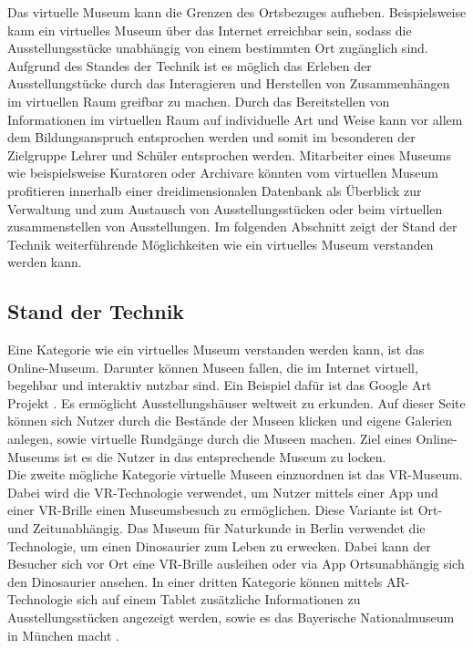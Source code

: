 \documentclass[runningheads,a4paper]{llncs}
\begin{document}
Das virtuelle Museum kann die Grenzen des Ortsbezuges aufheben. Beispielsweise kann ein virtuelles Museum über das Internet erreichbar sein, sodass die Ausstellungsstücke unabhängig von einem bestimmten Ort zugänglich sind. Aufgrund des Standes der Technik ist es möglich das Erleben der Ausstellungstücke durch das Interagieren und Herstellen von Zusammenhängen im virtuellen Raum greifbar zu machen. Durch das Bereitstellen von Informationen im virtuellen Raum auf individuelle Art und Weise kann vor allem dem Bildungsanspruch entsprochen werden und somit im besonderen der Zielgruppe Lehrer und Schüler entsprochen werden. Mitarbeiter eines Museums wie beispielsweise Kuratoren oder Archivare könnten vom virtuellen Museum profitieren innerhalb einer dreidimensionalen Datenbank als Überblick zur Verwaltung und zum Austausch von Ausstellungsstücken oder beim virtuellen zusammenstellen von Ausstellungen. Im folgenden Abschnitt zeigt der Stand der Technik weiterführende Möglichkeiten wie ein virtuelles Museum verstanden werden kann.\\

\subsection{Stand der Technik} \label{sect:standtechnik}

Eine Kategorie wie ein virtuelles Museum verstanden werden kann, ist das Online-Museum. Darunter können Museen fallen, die im Internet virtuell, begehbar und interaktiv nutzbar sind. Ein Beispiel dafür ist das Google Art Projekt \cite{GoogleCultureInstitut.2011}. Es ermöglicht Ausstellungshäuser weltweit zu erkunden. Auf dieser Seite können sich Nutzer durch die Bestände der Museen klicken und eigene Galerien anlegen, sowie virtuelle Rundgänge durch die Museen machen. Ziel eines Online-Museums ist es die Nutzer in das entsprechende Museum zu locken.\\ 

Die zweite mögliche Kategorie virtuelle Museen einzuordnen ist das VR-Museum. Dabei wird die VR-Technologie verwendet, um Nutzer mittels einer App und einer VR-Brille einen Museumsbesuch zu ermöglichen. Diese Variante ist Ort- und Zeitunabhängig. Das Museum für Naturkunde in Berlin verwendet die Technologie, um einen Dinosaurier zum Leben zu erwecken. Dabei kann der Besucher sich vor Ort eine VR-Brille ausleihen oder via App Ortsunabhängig sich den Dinosaurier ansehen. In einer dritten Kategorie können mittels AR-Technologie sich auf einem Tablet zusätzliche Informationen zu Ausstellungsstücken angezeigt werden, sowie es das Bayerische Nationalmuseum in München macht \cite{GoetheInstitute.V..2017}.\\
\end{document}
